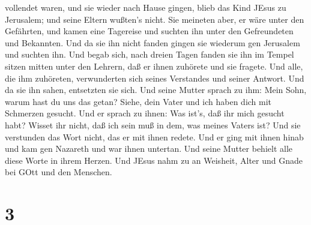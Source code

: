 vollendet waren, und sie wieder nach Hause gingen, blieb das Kind JEsus
zu Jerusalem; und seine Eltern wußten's nicht.  Sie
meineten aber, er wäre unter den Gefährten, und kamen eine Tagereise und
suchten ihn unter den Gefreundeten und Bekannten.  Und da
sie ihn nicht fanden gingen sie wiederum gen Jerusalem und suchten ihn.
 Und begab sich, nach dreien Tagen fanden sie ihn im Tempel
sitzen mitten unter den Lehrern, daß er ihnen zuhörete und sie fragete.
 Und alle, die ihm zuhöreten, verwunderten sich seines
Verstandes und seiner Antwort.  Und da sie ihn sahen,
entsetzten sie sich. Und seine Mutter sprach zu ihm: Mein Sohn, warum
hast du uns das getan? Siehe, dein Vater und ich haben dich mit
Schmerzen gesucht.  Und er sprach zu ihnen: Was ist's, daß
ihr mich gesucht habt? Wisset ihr nicht, daß ich sein muß in dem, was
meines Vaters ist?  Und sie verstunden das Wort nicht, das
er mit ihnen redete.  Und er ging mit ihnen hinab und kam
gen Nazareth und war ihnen untertan. Und seine Mutter behielt alle diese
Worte in ihrem Herzen.  Und JEsus nahm zu an Weisheit,
Alter und Gnade bei GOtt und den Menschen.

\hypertarget{section-2}{%
\section{3}\label{section-2}}

